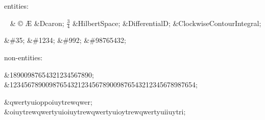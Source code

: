entities\+:

~ \& \copyright{} {\AE} \&\+Dcaron; {$\frac34$} \&\+Hilbert\+Space; \&\+Differential\+D; \&\+Clockwise\+Contour\+Integral;

\&\#35; \&\#1234; \&\#992; \&\#98765432;

non-\/entities\+:

\&18900987654321234567890; \&1234567890098765432123456789009876543212345678987654;

\&qwertyuioppoiuytrewqwer; \&oiuytrewqwertyuioiuytrewqwertyuioytrewqwertyuiiuytri; 